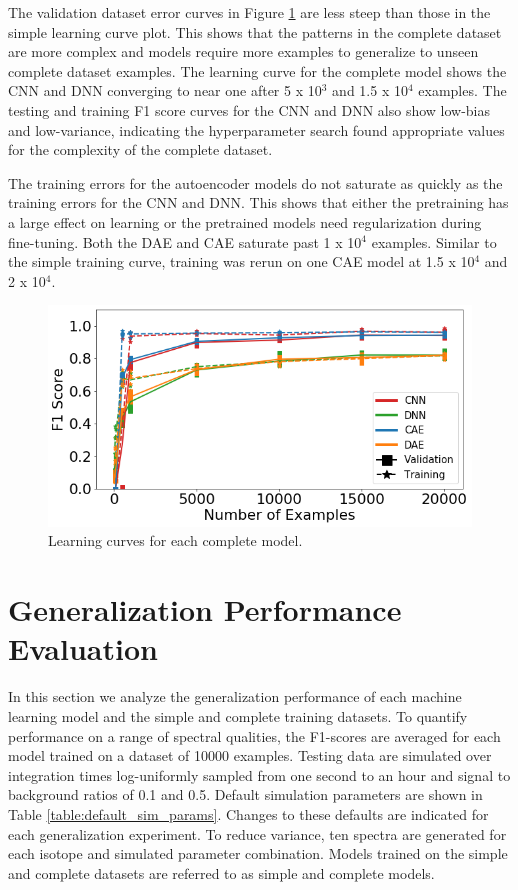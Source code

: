 The validation dataset error curves in Figure \ref{fig:learning_curves_full} are less steep than those in the simple learning curve plot. This shows that the patterns in the complete dataset are more complex and models require more examples to generalize to unseen complete dataset examples. The learning curve for the complete model shows the CNN and DNN converging to near one after 5 x 10$^{3}$ and 1.5 x 10$^{4}$ examples. The testing and training F1 score curves for the CNN and DNN also show low-bias and low-variance, indicating the hyperparameter search found appropriate values for the complexity of the complete dataset.

The training errors for the autoencoder models do not saturate as quickly as the training errors for the CNN and DNN. This shows that either the pretraining has a large effect on learning or the pretrained models need regularization during fine-tuning. Both the DAE and CAE saturate past 1 x 10$^{4}$ examples. Similar to the simple training curve, training was rerun on one CAE model at 1.5 x 10$^{4}$ and 2 x 10$^{4}$.


\begin{figure}[H]
	\centering
	\includegraphics[width=0.9\linewidth]{images/learning_curves_full}
	\caption{Learning curves for each complete model.}
	\label{fig:learning_curves_full}
\end{figure}



\section{Generalization Performance Evaluation}

In this section we analyze the generalization performance of each machine learning model and the simple and complete training datasets. To quantify performance on a range of spectral qualities, the F1-scores are averaged for each model trained on a dataset of 10000 examples. Testing data are simulated over integration times log-uniformly sampled from one second to an hour and signal to background ratios of 0.1 and 0.5. Default simulation parameters are shown in Table \ref{table:default_sim_params}. Changes to these defaults are indicated for each generalization experiment. To reduce variance, ten spectra are generated for each isotope and simulated parameter combination. Models trained on the simple and complete datasets are referred to as simple and complete models.

